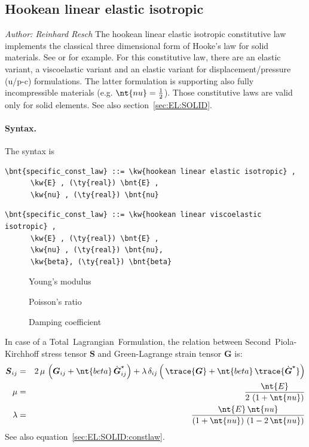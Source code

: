 \subsection{Hookean linear elastic isotropic}
\label{sec:CL:hookean:linear:elastic:isotropic}
\emph{Author: Reinhard Resch} The hookean linear elastic isotropic constitutive law implements the classical
three dimensional form of Hooke's law for solid materials.
See \cite{BATHE2016} or \cite{WALLRAPP1998} for example.
For this constitutive law, there are an elastic variant, a viscoelastic variant
and an elastic variant for displacement/pressure (u/p-c) formulations.
The latter formulation is supporting also fully incompressible materials (e.g. $\nt{nu} = \frac{1}{2}$).
Those constitutive laws are valid only for solid elements. See also section~\ref{sec:EL:SOLID}.

\paragraph{Syntax.}
The syntax is
\begin{Verbatim}[commandchars=\\\{\}]
    \bnt{specific_const_law} ::= \kw{hookean linear elastic isotropic} ,
      \kw{E} , (\ty{real}) \bnt{E} ,
      \kw{nu} , (\ty{real}) \bnt{nu}
\end{Verbatim}

\begin{Verbatim}[commandchars=\\\{\}]
    \bnt{specific_const_law} ::= \kw{hookean linear viscoelastic isotropic} ,
      \kw{E} , (\ty{real}) \bnt{E} ,
      \kw{nu} , (\ty{real}) \bnt{nu},
      \kw{beta}, (\ty{real}) \bnt{beta}
\end{Verbatim}

\begin{description}
\item[] Young's modulus
\item[] Poisson's ratio
\item[] Damping coefficient
\end{description}
In case of a Total~Lagrangian~Formulation, the relation between Second~Piola-Kirchhoff stress tensor $\boldsymbol{S}$
and Green-Lagrange strain tensor $\boldsymbol{G}$ is:
\begin{eqnarray}
  \boldsymbol{S}_{ij} & = & 2 \, \mu \, \left(\boldsymbol{G}_{ij} + \nt{beta} \, \dot{\boldsymbol{G}}_{ij}^{\star} \right) + \lambda \, \delta_{ij} \left( \, \trace{\boldsymbol{G}} + \nt{beta} \, \trace{\dot{\boldsymbol{G}}^{\star}}\right) \label{SEC:CL:hookean:sigma} \\
  \mu & = & \frac{\nt{E}}{2 \, \left(1 + \nt{nu}\right)} \\
  \lambda & = & \frac{\nt{E} \, \nt{nu}}{\left(1 + \nt{nu}\right) \, \left(1 - 2 \, \nt{nu} \right)}
\end{eqnarray}
See also equation~\ref{sec:EL:SOLID:constlaw}.

